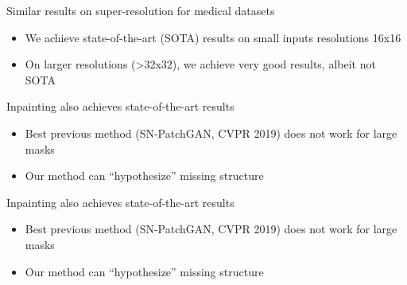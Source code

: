 \begin{frame}{Similar results on super-resolution for medical datasets}

\begin{itemize}
 \item We achieve state-of-the-art (SOTA) results on small inputs resolutions 16x16
 \item On larger resolutions (>32x32), we achieve very good results, albeit not SOTA
\end{itemize}

\begin{center}
\vt
{}
\end{center}
 
\end{frame}

\begin{frame}{Inpainting also achieves state-of-the-art results}

\begin{itemize}
 \item Best previous method (SN-PatchGAN, CVPR 2019) does not work for large masks
 \item Our method can ``hypothesize'' missing structure
\end{itemize}

\begin{center}
{}
\end{center}
 
\end{frame}

\begin{frame}{Inpainting also achieves state-of-the-art results}

\begin{itemize}
 \item Best previous method (SN-PatchGAN, CVPR 2019) does not work for large masks
 \item Our method can ``hypothesize'' missing structure
\end{itemize}

\begin{center}
\vt
{}
\end{center}
 
\end{frame}

